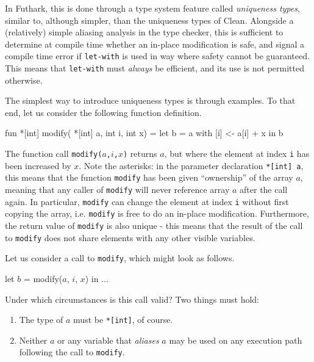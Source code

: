 \documentclass[oneside]{memoir}
\newcommand{\emp}[1]{\textcolor{DikuRed}{ #1}}
\begin{document}
In Futhark, this is done through a type system feature called
\textit{uniqueness types}, similar to, although simpler, than the
uniqueness types of Clean.  Alongside a (relatively) simple aliasing
analysis in the type checker, this is sufficient to determine at
compile time whether an in-place modification is safe, and signal a
compile time error if \texttt{let-with} is used in way where safety
cannot be guaranteed.  This means that \texttt{let-with} must
\textit{always} be efficient, and its use is not permitted otherwise.

The simplest way to introduce uniqueness types is through examples.
To that end, let us consider the following function definition.

\begin{colorcode}
fun \emp{*}[int] modify(\emp{*}[int] a, int i, int x) =
  let b = a with [i] <- a[i] + x in
  b
\end{colorcode}

The function call \texttt{modify($a$,$i$,$x$)} returns $a$, but where
the element at index \texttt{i} has been increased by $x$.  Note the
\emp{asterisks}: in the parameter declaration \texttt{*[int] a}, this
means that the function \texttt{modify} has been given ``ownership''
of the array $a$, meaning that any caller of \texttt{modify} will
never reference array $a$ after the call again.  In particular,
\texttt{modify} can change the element at index \texttt{i} without
first copying the array, i.e. \texttt{modify} is free to do an
in-place modification.  Furthermore, the return value of
\texttt{modify} is also unique - this means that the result of the
call to \texttt{modify} does not share elements with any other visible
variables.

Let us consider a call to \texttt{modify}, which might look as
follows.

\begin{colorcode}
let \(b\) = modify(\(a\), \(i\), \(x\)) in
...
\end{colorcode}

Under which circumstances is this call valid?  Two things must hold:
\begin{enumerate}
\item The type of \texttt{$a$} must be \texttt{*[int]}, of course.

\item Neither \texttt{$a$} or any variable that \textit{aliases}
  \texttt{$a$} may be used on any execution path following the call to
  \texttt{modify}.
\end{enumerate}
\end{document}
